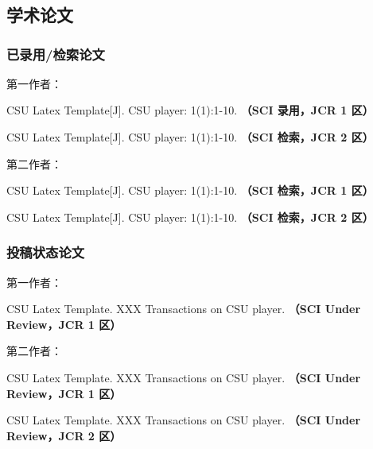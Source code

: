 \section{\hspace*{-2.5em}{攻读学位期间主要研究成果}} %

\ifblindreview
\fi
\subsection*{学术论文}

\ifblindreview



\subsubsection*{已录用/检索论文}
\noindent
第一作者：
\begin{enumerate}[label={[\arabic*]}]
\item CSU Latex Template[J]. CSU player: 1(1):1-10. {\bfseries \heiti（SCI 录用，JCR 1 区）}
\item CSU Latex Template[J]. CSU player: 1(1):1-10. {\bfseries \heiti（SCI 检索，JCR 2 区）}
\end{enumerate}
第二作者：
\begin{enumerate}[label={[\arabic*]}]
\item CSU Latex Template[J]. CSU player: 1(1):1-10. {\bfseries \heiti（SCI 检索，JCR 1 区）}
\item CSU Latex Template[J]. CSU player: 1(1):1-10. {\bfseries \heiti（SCI 检索，JCR 2 区）}
\end{enumerate}
\noindent
\subsubsection*{投稿状态论文}
\noindent
第一作者：
\begin{enumerate}[label={[\arabic*]}]
\item CSU Latex Template. XXX Transactions on CSU player. {\bfseries \heiti（SCI Under Review，JCR 1 区）}
\end{enumerate}
第二作者：
\begin{enumerate}[label={[\arabic*]}]
\item CSU Latex Template. XXX Transactions on CSU player. {\bfseries \heiti（SCI Under Review，JCR 1 区）}
\item CSU Latex Template. XXX Transactions on CSU player. {\bfseries \heiti（SCI Under Review，JCR 2 区）}
\end{enumerate}


